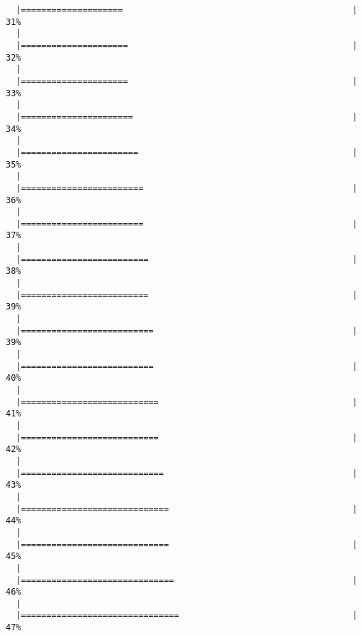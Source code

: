 \documentclass[]{article}
\begin{document}
\begin{verbatim}
  |====================                                             |  31%
  |                                                                       
  |=====================                                            |  32%
  |                                                                       
  |=====================                                            |  33%
  |                                                                       
  |======================                                           |  34%
  |                                                                       
  |=======================                                          |  35%
  |                                                                       
  |========================                                         |  36%
  |                                                                       
  |========================                                         |  37%
  |                                                                       
  |=========================                                        |  38%
  |                                                                       
  |=========================                                        |  39%
  |                                                                       
  |==========================                                       |  39%
  |                                                                       
  |==========================                                       |  40%
  |                                                                       
  |===========================                                      |  41%
  |                                                                       
  |===========================                                      |  42%
  |                                                                       
  |============================                                     |  43%
  |                                                                       
  |=============================                                    |  44%
  |                                                                       
  |=============================                                    |  45%
  |                                                                       
  |==============================                                   |  46%
  |                                                                       
  |===============================                                  |  47%

\end{verbatim}
\end{document}
